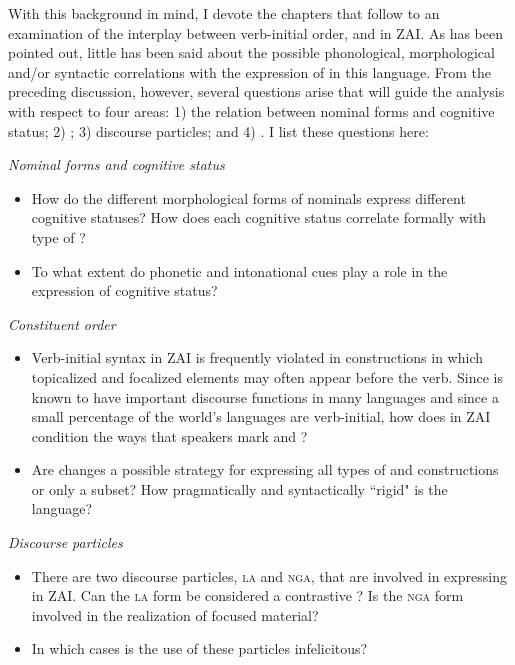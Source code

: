 With this background in mind, I devote the chapters that follow to an examination of the interplay between verb-initial order,  and  in ZAI. As has been pointed out, little has been said about the possible phonological, morphological and/or syntactic correlations with the expression of  in this language. From the preceding discussion, however, several questions arise that will guide the analysis with respect to four areas: 1) the relation between nominal forms and cognitive status; 2) ; 3) discourse particles; and 4) . I list these questions here: 

\singlespacing
\vspace{3mm}
\noindent \textit{Nominal forms and cognitive status}
\begin{itemize}
\item How do the different morphological forms of nominals express different cognitive statuses? How does each cognitive status correlate formally with type of ?
\item To what extent do phonetic and intonational cues play a role in the expression of cognitive status?
\end{itemize}

\vspace{3mm}
\noindent \textit{Constituent order}
\begin{itemize}
\item Verb-initial syntax in ZAI is frequently violated in constructions in which topicalized and focalized elements may often appear before the verb. Since  is known to have important discourse functions in many languages and since a small percentage of the world's languages are verb-initial, how does  in ZAI condition the ways that speakers mark  and ? 
\item Are  changes a possible strategy for expressing all types of  and  constructions or only a subset? How pragmatically and syntactically ``rigid" is the language?
\end{itemize}

\vspace{3mm}
\noindent \textit{Discourse particles}
\begin{itemize}
\item There are two discourse particles, \textsc{la} and \textsc{nga}, that are involved in expressing  in ZAI. Can the \textsc{la} form be considered a contrastive ? Is the \textsc{nga} form involved in the realization of focused material? 
\item In which cases is the use of these particles infelicitous?
\end{itemize}

